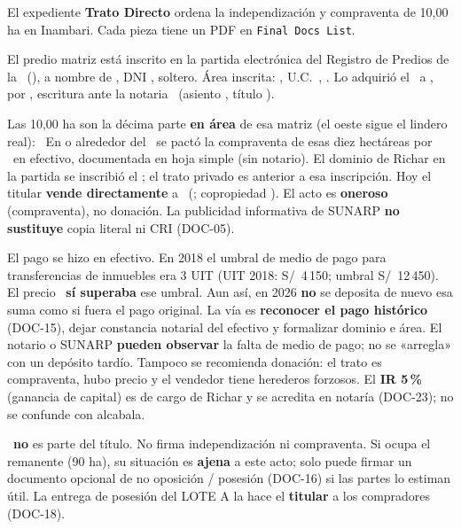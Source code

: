 \documentclass[12pt,a4paper]{article}
\begin{document}


\noindent El expediente \textbf{Trato Directo} ordena la independización y compraventa de 10,00 ha en Inambari. Cada pieza tiene un PDF en \texttt{Final Docs List}.

El predio matriz está inscrito en la partida electrónica \textbf{\PartidaMatriz} del Registro de Predios de la \OficinaRegistral\ (\ZonaRegistral), a nombre de \VendedorNombreCompleto, DNI \VendedorDNI, soltero. Área inscrita: \textbf{\AreaMatriz}, U.C.\ \UnidadCatastral, \UbicacionRegistral. Lo adquirió el \FechaAdquisicionMatriz\ a \VendedoresAnteriores, por \PrecioAdquisicionMatriz, escritura ante la notaria \NotarioAdquisicion\ (asiento \AsientoDominio, título \TituloSunarpDominio).

Las 10,00 ha son la décima parte \textbf{en área} de esa matriz (el oeste sigue el lindero real): \CriterioRecorte\ En o alrededor del \FechaPago\ se pactó la compraventa de esas diez hectáreas por \MontoPago\ en efectivo, documentada en hoja simple (sin notario). El dominio de Richar en la partida se inscribió el \FechaInscripcionDominio; el trato privado es anterior a esa inscripción. Hoy el titular \textbf{vende directamente} a \CompradorNombreCompleto\ (\CompradorParentesco; copropiedad \PorcentajeCopropiedad). El acto es \textbf{oneroso} (compraventa), no donación. La publicidad informativa de SUNARP \textbf{no sustituye} copia literal ni CRI (DOC-05).

El pago se hizo en efectivo. En 2018 el umbral de medio de pago para transferencias de inmuebles era 3 UIT (UIT 2018: S/\ 4\,150; umbral S/\ 12\,450). El precio \MontoPago\ \textbf{sí superaba} ese umbral. Aun así, en 2026 \textbf{no} se deposita de nuevo esa suma como si fuera el pago original. La vía es \textbf{reconocer el pago histórico} (DOC-15), dejar constancia notarial del efectivo y formalizar dominio e área. El notario o SUNARP \textbf{pueden observar} la falta de medio de pago; no se «arregla» con un depósito tardío. Tampoco se recomienda donación: el trato es compraventa, hubo precio y el vendedor tiene herederos forzosos. El \textbf{IR 5\,\%} (ganancia de capital) es de cargo de Richar y se acredita en notaría (DOC-23); no se confunde con alcabala.

\IntermediarioNombre\ \textbf{no} es parte del título. No firma independización ni compraventa. Si ocupa el remanente (90 ha), su situación es \textbf{ajena} a este acto; solo puede firmar un documento opcional de no oposición / posesión (DOC-16) si las partes lo estiman útil. La entrega de posesión del LOTE A la hace el \textbf{titular} a los compradores (DOC-18).
\end{document}
